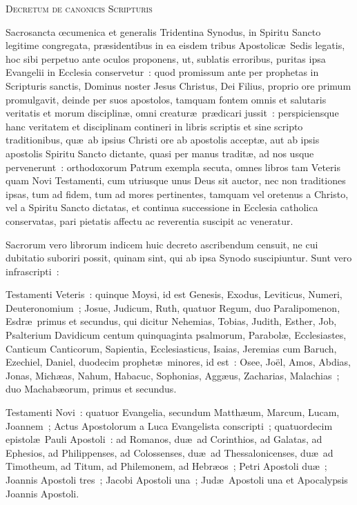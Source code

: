 \begin{center}
\textsc{Decretum de canonicis Scripturis}
\end{center}
\noindent Sacrosancta \oe cumenica et generalis Tridentina Synodus, in Spiritu 
Sancto 
legitime congregata, pr\ae sidentibus in ea eisdem tribus Apostolic\ae\ Sedis 
legatis, hoc sibi perpetuo ante oculos proponens, ut, sublatis erroribus, 
puritas ipsa Evangelii in Ecclesia conservetur~: quod promissum ante per 
prophetas in Scripturis sanctis, Dominus noster Jesus Christus, Dei Filius, 
proprio ore primum promulgavit, deinde per suos apostolos, tamquam fontem omnis 
et salutaris veritatis et morum disciplin\ae, omni creatur\ae\
pr\ae dicari jussit~: perspiciensque hanc veritatem et disciplinam contineri 
in libris scriptis et sine scripto traditionibus, qu\ae\ ab ipsius 
Christi ore ab apostolis accept\ae, aut ab ipsis apostolis Spiritu Sancto 
dictante, quasi per manus tradit\ae, ad nos usque pervenerunt~: orthodoxorum 
Patrum exempla secuta, omnes libros tam Veteris quam Novi Testamenti, cum 
utriusque unus Deus sit auctor, nec non traditiones ipsas, tum ad fidem, tum ad 
mores pertinentes, tamquam vel oretenus a Christo, vel a Spiritu Sancto 
dictatas, et continua successione in Ecclesia catholica conservatas, pari 
pietatis affectu ac reverentia suscipit ac veneratur.

Sacrorum vero librorum indicem huic decreto ascribendum censuit, ne cui 
dubitatio suboriri possit, quinam sint, qui ab ipsa Synodo suscipiuntur. Sunt 
vero infrascripti~:

Testamenti Veteris~: quinque Moysi, id est Genesis, Exodus,
Leviticus, Numeri, 
Deuteronomium~; Josue, Judicum, Ruth, quatuor Regum, duo Paralipomenon, 
Esdr\ae\ primus et secundus, qui dicitur Nehemias, Tobias, Judith, Esther, Job, 
Psalterium Davidicum centum quinquaginta psalmorum, Parabol\ae, 
Ecclesiastes, Canticum Canticorum, Sapientia, Ecclesiasticus, Isaias, Jeremias 
cum Baruch, Ezechiel, Daniel, duodecim prophet\ae\ minores, id est~: 
Osee, Jo\"el, Amos, Abdias, Jonas, Mich\ae as, Nahum, Habacuc, Sophonias, 
Agg\ae us, Zacharias, Malachias~; duo Machab\ae orum, primus et secundus.

Testamenti Novi~: quatuor Evangelia, secundum Matth\ae um, Marcum, Lucam, 
Joannem~; Actus Apostolorum a Luca Evangelista conscripti~; quatuordecim 
epistol\ae\ Pauli Apostoli~: ad Romanos, du\ae\ ad Corinthios, ad Galatas, ad 
Ephesios, ad Philippenses, ad Colossenses, du\ae\ ad Thessalonicenses, 
du\ae\ ad Timotheum, ad Titum, ad Philemonem, ad Hebr\ae os~; Petri 
Apostoli du\ae~; Joannis Apostoli tres~; Jacobi Apostoli una~; Jud\ae\ 
Apostoli una et Apocalypsis Joannis Apostoli.

